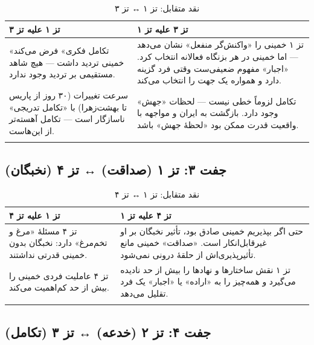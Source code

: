 \begin{longtable}{%
    >{\raggedleft\arraybackslash}p{}
    >{\raggedleft\arraybackslash}p{}}
\toprule
\rowcolor{cGreen!10}
\textbf{تز ۱ علیه تز ۳} &
\rowcolor{cGold!10}
\textbf{تز ۳ علیه تز ۱} \\
\midrule

«تکامل فکری» فرض می‌کند خمینی تردید داشت — هیچ شاهد مستقیمی بر تردید وجود ندارد. &
تز ۱ خمینی را «واکنش‌گر منفعل» نشان می‌دهد — اما خمینی در هر بزنگاه فعالانه انتخاب کرد. «اجبار» مفهوم ضعیفی‌ست وقتی فرد گزینه دارد و همواره یک جهت را انتخاب می‌کند. \\
\midrule

سرعت تغییرات (۳۰ روز از پاریس تا بهشت‌زهرا) با «تکامل تدریجی» ناسازگار است — تکامل آهسته‌تر از این‌هاست. &
تکامل لزوماً خطی نیست — لحظات «جهش» وجود دارد. بازگشت به ایران و مواجهه با واقعیت قدرت ممکن بود «لحظهٔ جهش» باشد. \\

\bottomrule
\caption{نقد متقابل: تز ۱ ↔ تز ۳}
\end{longtable}

\subsection{جفت ۳: تز ۱ (صداقت) ↔ تز ۴ (نخبگان)}

\begin{longtable}{%
    >{\raggedleft\arraybackslash}p{}
    >{\raggedleft\arraybackslash}p{}}
\toprule
\rowcolor{cGreen!10}
\textbf{تز ۱ علیه تز ۴} &
\rowcolor{cConsolid!8}
\textbf{تز ۴ علیه تز ۱} \\
\midrule

تز ۴ مسئلهٔ «مرغ و تخم‌مرغ» دارد: نخبگان بدون خمینی قدرتی نداشتند. &
حتی اگر بپذیریم خمینی صادق بود، تأثیر نخبگان بر او غیرقابل‌انکار است. «صداقت» خمینی مانع تأثیرپذیری‌اش از حلقهٔ درونی نمی‌شود. \\
\midrule

تز ۴ عاملیت فردی خمینی را بیش از حد کم‌اهمیت می‌کند. &
تز ۱ نقش ساختارها و نهادها را بیش از حد نادیده می‌گیرد و همه‌چیز را به «اراده» یا «اجبار» یک فرد تقلیل می‌دهد. \\

\bottomrule
\caption{نقد متقابل: تز ۱ ↔ تز ۴}
\end{longtable}

\subsection{جفت ۴: تز ۲ (خدعه) ↔ تز ۳ (تکامل)}


